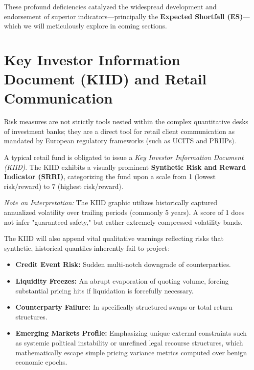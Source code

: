 These profound deficiencies catalyzed the widespread development and endorsement of superior indicators—principally the \textbf{Expected Shortfall (ES)}—which we will meticulously explore in coming sections.

\section{Key Investor Information Document (KIID) and Retail Communication}

Risk measures are not strictly tools nested within the complex quantitative desks of investment banks; they are a direct tool for retail client communication as mandated by European regulatory frameworks (such as UCITS and PRIIPs).

A typical retail fund is obligated to issue a \textit{Key Investor Information Document (KIID)}. The KIID exhibits a visually prominent \textbf{Synthetic Risk and Reward Indicator (SRRI)}, categorizing the fund upon a scale from 1 (lowest risk/reward) to 7 (highest risk/reward).

\textit{Note on Interpretation:} The KIID graphic utilizes historically captured annualized volatility over trailing periods (commonly 5 years). A score of 1 does not infer "guaranteed safety," but rather extremely compressed volatility bands.

The KIID will also append vital qualitative warnings reflecting risks that synthetic, historical quantiles inherently fail to project:
\begin{itemize}
    \item \textbf{Credit Event Risk:} Sudden multi-notch downgrade of counterparties.
    \item \textbf{Liquidity Freezes:} An abrupt evaporation of quoting volume, forcing substantial pricing hits if liquidation is forcefully necessary.
    \item \textbf{Counterparty Failure:} In specifically structured swaps or total return structures.
    \item \textbf{Emerging Markets Profile:} Emphasizing unique external constraints such as systemic political instability or unrefined legal recourse structures, which mathematically escape simple pricing variance metrics computed over benign economic epochs.
\end{itemize}
